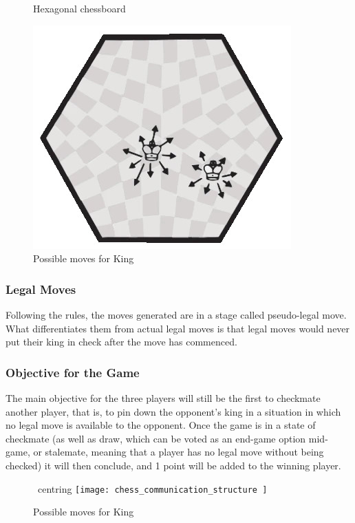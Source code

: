 \documentclass[10pt]{article}
\begin{document}
\begin{figure}
\centering
\begin{minipage}{.5\textwidth}
\centering

\caption{Hexagonal chessboard}
\label{fig:board}
\end{minipage}\hfill
\begin{minipage}{.5\textwidth}
\centering
\includegraphics[width = \linewidth]{ king_moves }
\caption{Possible moves for King}
\label{fig:moves}
\end{minipage}
\end{figure}

\subsubsection{Legal Moves}
Following the rules, the moves generated are in a stage called pseudo-legal move. What differentiates them from actual legal moves is that legal moves would never put their king in check after the move has commenced.
\subsubsection{Objective for the Game}
The main objective for the three players will still be the first to checkmate another player, that is, to pin down the opponent's king in a situation in which no legal move is available to the opponent. Once the game is in a state of checkmate (as well as draw, which can be voted as an end-game option mid-game, or stalemate, meaning that a player has no legal move without being checked) it will then conclude, and 1 point will be added to the winning player.\newline
\begin{figure}
\begin{minipage}{.5\textwidth}
\ centring
\texttt{[image:  chess\_communication\_structure ]}
\caption{Possible moves for King}
\label{fig:moves}
\end{minipage}
\end{figure}
\end{document}
